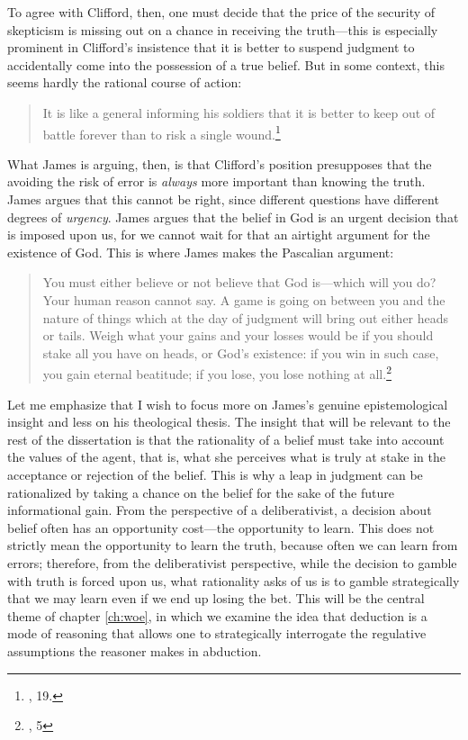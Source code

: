 To agree with Clifford, then, one must decide that the price of the
security of skepticism is missing out on a chance in receiving the
truth---this is especially prominent in Clifford's insistence that it is
better to suspend judgment to accidentally come into the possession of a
true belief. But in some context, this seems hardly the rational course
of action:

\begin{quote}
It is like a general informing his soldiers that it is better to keep
out of battle forever than to risk a single wound.\footnote{\cite{jameswill}, 19.}
\end{quote}

What James is arguing, then, is that Clifford's position presupposes that
the avoiding the risk of error is \emph{always} more important than
knowing the truth. James argues that this cannot be right, since different questions have different degrees of \emph{urgency}. James argues that the belief in God is an urgent decision that is imposed upon us, for we cannot wait for that an airtight argument for the existence of God. This is where James makes the Pascalian argument:

\begin{quote}
	
You must either believe or not believe that God is---which will you do? Your human reason cannot say. A game is going on between you and the nature of things which at the day of judgment will bring out either heads or tails. Weigh what your gains and your losses would be if you should stake all you have on heads, or God's existence: if you win in such case, you gain eternal beatitude; if you lose, you lose nothing at all.\footnote{\cite{jameswill}, 5}

\end{quote}

Let me emphasize that I wish to focus more on James's genuine epistemological insight and less on his theological thesis. The insight that will be relevant to the rest of the dissertation is that the rationality of a belief must take into account the values of the agent, that is, what she perceives what is truly at stake in the acceptance or rejection of the belief. This is why a leap in judgment can be rationalized by taking a chance on the belief for the sake of the future informational gain. From the perspective of a deliberativist, a decision about belief often has an opportunity cost---the opportunity to learn. This does not strictly mean the opportunity to learn the truth, because often we can learn from errors; therefore, from the deliberativist perspective, while the decision to gamble with truth is forced upon us, what rationality asks of us is to gamble strategically that we may learn even if we end up losing the bet. This will be the central theme of chapter \ref{ch:woe}, in which we examine the idea that deduction is a mode of reasoning that allows one to strategically interrogate the regulative assumptions the reasoner makes in abduction.
 
